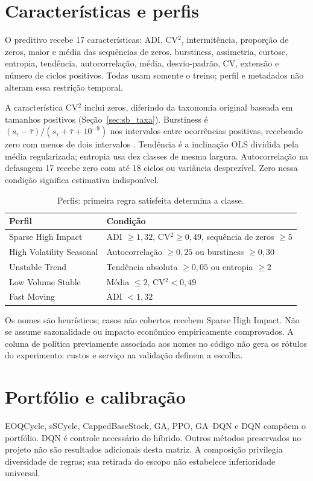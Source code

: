 \section{Características e perfis}
\label{sec:carac_series}
O preditivo recebe 17 características: ADI, CV$^2$, intermitência, proporção de zeros, maior e média das sequências de zeros, burstiness, assimetria, curtose, entropia, tendência, autocorrelação, média, desvio-padrão, CV, extensão e número de ciclos positivos. Todas usam somente o treino; perfil e metadados não alteram essa restrição temporal.

A característica CV$^2$ inclui zeros, diferindo da taxonomia original baseada em tamanhos positivos (Seção~\ref{sec:sb_taxa}). Burstiness é $(s_\tau-\bar\tau)/(s_\tau+\bar\tau+10^{-9})$ nos intervalos entre ocorrências positivas, recebendo zero com menos de dois intervalos \citep{GohBarabasi2008Burstiness}. Tendência é a inclinação OLS dividida pela média regularizada; entropia usa dez classes de mesma largura. Autocorrelação na defasagem 17 recebe zero com até 18 ciclos ou variância desprezível. Zero nessa condição significa estimativa indisponível.

\begin{table}[htbp]\centering\small
\caption{Perfis: primeira regra satisfeita determina a classe.}\label{tab:pod}
\begin{tabular}{@{}p{4.2cm}p{8.2cm}@{}}\toprule
Perfil & Condição\\\midrule
Sparse High Impact & ADI $\geq1{,}32$, CV$^2\geq0{,}49$, sequência de zeros $\geq5$\\
High Volatility Seasonal & Autocorrelação $\geq0{,}25$ ou burstiness $\geq0{,}30$\\
Unstable Trend & Tendência absoluta $\geq0{,}05$ ou entropia $\geq2$\\
Low Volume Stable & Média $\leq2$, CV$^2<0{,}49$\\
Fast Moving & ADI $<1{,}32$\\\bottomrule
\end{tabular}\end{table}

Os nomes são heurísticos; casos não cobertos recebem Sparse High Impact. Não se assume sazonalidade ou impacto econômico empiricamente comprovados. A coluna de política previamente associada aos nomes no código não gera os rótulos do experimento: custos e serviço na validação definem a escolha.

\section{Portfólio e calibração}
\label{sec:benchmark_massivo}\label{sec:portfolio_ampliado}
EOQCycle, sSCycle, CappedBaseStock, GA, PPO, GA--DQN e DQN compõem o portfólio. DQN é controle necessário do híbrido. Outros métodos preservados no projeto não são resultados adicionais desta matriz. A composição privilegia diversidade de regras; sua retirada do escopo não estabelece inferioridade universal.


